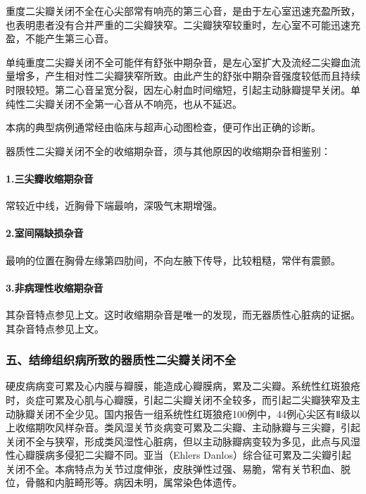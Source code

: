 重度二尖瓣关闭不全在心尖部常有响亮的第三心音，是由于左心室迅速充盈所致，也表明患者没有合并严重的二尖瓣狭窄。二尖瓣狭窄较重时，左心室不可能迅速充盈，不能产生第三心音。

单纯重度二尖瓣关闭不全可能伴有舒张中期杂音，是左心室扩大及流经二尖瓣血流量增多，产生相对性二尖瓣狭窄所致。由此产生的舒张中期杂音强度较低而且持续时限较短。第二心音呈宽分裂，因左心射血时间缩短，引起主动脉瓣提早关闭。单纯性二尖瓣关闭不全第一心音从不响亮，也从不延迟。

本病的典型病例通常经由临床与超声心动图检查，便可作出正确的诊断。

器质性二尖瓣关闭不全的收缩期杂音，须与其他原因的收缩期杂音相鉴别：

\paragraph{1.三尖瓣收缩期杂音}

常较近中线，近胸骨下端最响，深吸气末期增强。

\paragraph{2.室间隔缺损杂音}

最响的位置在胸骨左缘第四肋间，不向左腋下传导，比较粗糙，常伴有震颤。

\paragraph{3.非病理性收缩期杂音}

其杂音特点参见上文。这时收缩期杂音是唯一的发现，而无器质性心脏病的证据。其杂音特点参见上文。

\subsubsection{五、结缔组织病所致的器质性二尖瓣关闭不全}

硬皮病病变可累及心内膜与瓣膜，能造成心瓣膜病，累及二尖瓣。系统性红斑狼疮时，炎症可累及心肌与心瓣膜，引起二尖瓣关闭不全较多，而引起二尖瓣狭窄及主动脉瓣关闭不全少见。国内报告一组系统性红斑狼疮100例中，44例心尖区有Ⅱ级以上收缩期吹风样杂音。类风湿关节炎病变可累及二尖瓣、主动脉瓣与三尖瓣，引起关闭不全与狭窄，形成类风湿性心脏病，但以主动脉瓣病变较为多见，此点与风湿性心瓣膜病多侵犯二尖瓣不同。亚当（Ehlers
Danlos）综合征可累及二尖瓣引起关闭不全。本病特点为关节过度伸张，皮肤弹性过强、易脆，常有关节积血、脱位，骨骼和内脏畸形等。病因未明，属常染色体遗传。

